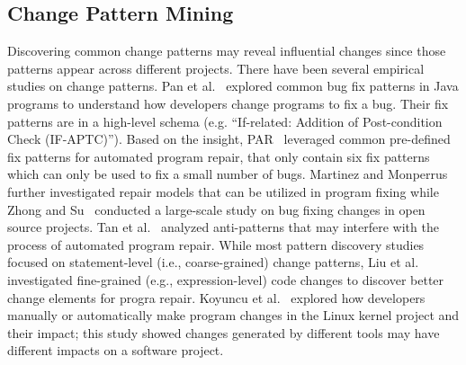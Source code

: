 \subsection{Change Pattern Mining}
Discovering common change patterns may reveal influential changes since those patterns
appear across different projects.
There have been several empirical studies on change patterns.
Pan et al.~\cite{pan2009toward} explored common bug fix patterns in Java programs to understand how developers change programs to fix a bug. 
Their fix patterns are in a high-level schema (e.g. ``If-related: Addition of Post-condition Check (IF-APTC)'').
Based on the insight, PAR~\cite{kim2013automatic} leveraged common pre-defined fix patterns for automated program repair, that only contain six fix patterns which can only be used to fix a small number of bugs. 
Martinez and Monperrus further investigated repair models that can be utilized in program fixing while Zhong and Su~\cite{zhong2015empirical} conducted a large-scale study on bug fixing changes in open source projects. Tan et al.~\cite{tan2016anti} analyzed anti-patterns that may interfere with the process of automated program repair. 
While most pattern discovery studies focused on statement-level (i.e., coarse-grained) change patterns, 
Liu et al.~\cite{liu_closer_2018} investigated fine-grained (e.g., expression-level) code changes to
discover better change elements for progra repair.
Koyuncu et al.~\cite{koyuncu_impact_2017} explored how developers manually or automatically make program changes in
the Linux kernel project and their impact; this study showed changes generated by different tools may have 
different impacts on a software project.


